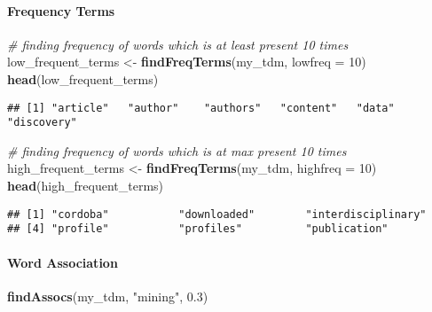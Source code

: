 \documentclass[
]{article}
\newenvironment{Shaded}{\begin{snugshade}}{\end{snugshade}}
\newcommand{\AttributeTok}[1]{\textcolor[rgb]{0.13,0.29,0.53}{#1}}
\newcommand{\CommentTok}[1]{\textcolor[rgb]{0.56,0.35,0.01}{\textit{#1}}}
\newcommand{\DecValTok}[1]{\textcolor[rgb]{0.00,0.00,0.81}{#1}}
\newcommand{\FloatTok}[1]{\textcolor[rgb]{0.00,0.00,0.81}{#1}}
\newcommand{\FunctionTok}[1]{\textcolor[rgb]{0.13,0.29,0.53}{\textbf{#1}}}
\newcommand{\NormalTok}[1]{#1}
\newcommand{\OtherTok}[1]{\textcolor[rgb]{0.56,0.35,0.01}{#1}}
\newcommand{\StringTok}[1]{\textcolor[rgb]{0.31,0.60,0.02}{#1}}
\begin{document}
\hypertarget{frequency-terms}{%
\paragraph{Frequency Terms}\label{frequency-terms}}

\begin{Shaded}
\begin{Highlighting}[]
\CommentTok{\# finding frequency of words which is at least present 10 times}
\NormalTok{low\_frequent\_terms }\OtherTok{\textless{}{-}} \FunctionTok{findFreqTerms}\NormalTok{(my\_tdm, }\AttributeTok{lowfreq =} \DecValTok{10}\NormalTok{)}
\FunctionTok{head}\NormalTok{(low\_frequent\_terms)}
\end{Highlighting}
\end{Shaded}

\begin{verbatim}
## [1] "article"   "author"    "authors"   "content"   "data"      "discovery"
\end{verbatim}

\begin{Shaded}
\begin{Highlighting}[]
\CommentTok{\# finding frequency of words which is at max present 10 times}
\NormalTok{high\_frequent\_terms }\OtherTok{\textless{}{-}} \FunctionTok{findFreqTerms}\NormalTok{(my\_tdm, }\AttributeTok{highfreq =} \DecValTok{10}\NormalTok{)}
\FunctionTok{head}\NormalTok{(high\_frequent\_terms)}
\end{Highlighting}
\end{Shaded}

\begin{verbatim}
## [1] "cordoba"           "downloaded"        "interdisciplinary"
## [4] "profile"           "profiles"          "publication"
\end{verbatim}

\hypertarget{word-association}{%
\paragraph{Word Association}\label{word-association}}

\begin{Shaded}
\begin{Highlighting}[]
\FunctionTok{findAssocs}\NormalTok{(my\_tdm, }\StringTok{"mining"}\NormalTok{, }\FloatTok{0.3}\NormalTok{)}
\end{Highlighting}
\end{Shaded}
\end{document}
